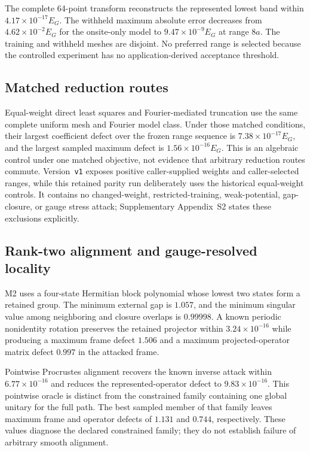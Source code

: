 \documentclass[preprint,12pt]{elsarticle}
\begin{document}
The complete 64-point transform reconstructs the represented lowest band
within $4.17\times10^{-17}E_G$. The withheld maximum absolute error decreases
from $4.62\times10^{-2}E_G$ for the onsite-only model to
$9.47\times10^{-9}E_G$ at range $8a$. The training and withheld meshes are
disjoint. No preferred range is selected because the controlled experiment has
no application-derived acceptance threshold.

\subsection{Matched reduction routes}
\label{sec:matched-routes}

Equal-weight direct least squares and Fourier-mediated truncation use the same
complete uniform mesh and Fourier model class. Under those matched conditions,
their largest coefficient defect over the frozen range sequence is
$7.38\times10^{-17}E_G$, and the largest sampled maximum defect is
$1.56\times10^{-16}E_G$. This is an algebraic control under one matched objective,
not evidence that arbitrary reduction routes commute. Version~\texttt{v1} exposes
positive caller-supplied weights and caller-selected ranges, while this retained
parity run deliberately uses the historical equal-weight controls. It contains no
changed-weight, restricted-training, weak-potential, gap-closure, or gauge stress
attack; Supplementary Appendix~S2 states these exclusions explicitly.

\subsection{Rank-two alignment and gauge-resolved locality}
\label{sec:multiband-alignment}

M2 uses a four-state Hermitian block polynomial whose lowest two states form a
retained group. The minimum external gap is $1.057$, and the minimum singular
value among neighboring and closure overlaps is $0.99998$. A known periodic
nonidentity rotation preserves the retained projector within
$3.24\times10^{-16}$ while producing a maximum frame defect $1.506$ and a
maximum projected-operator matrix defect $0.997$ in the attacked frame.

Pointwise Procrustes alignment recovers the known inverse attack within
$6.77\times10^{-16}$ and reduces the represented-operator defect to
$9.83\times10^{-16}$. This pointwise oracle is distinct from the constrained
family containing one global unitary for the full path. The best sampled member
of that family leaves maximum frame and operator defects of $1.131$ and $0.744$,
respectively. These values diagnose the declared constrained family; they do
not establish failure of arbitrary smooth alignment.
\end{document}

